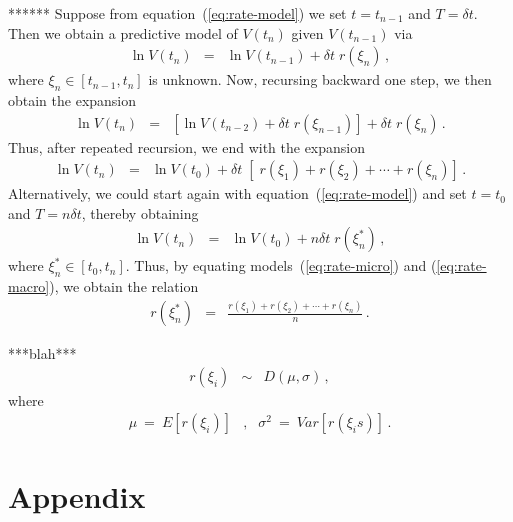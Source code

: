 \documentclass[a4paper]{book}
\begin{document}
******
Suppose from equation~(\ref{eq:rate-model}) we set $t=t_{n-1}$
and $T=\delta t$. Then we obtain a predictive model of $V(t_n)$
given $V(t_{n-1})$ via
\begin{eqnarray}
\ln V(t_n) & = & \ln V(t_{n-1})+\delta t\;r(\xi_{n})\,,
\end{eqnarray}
where $\xi_n\in[t_{n-1},t_{n}]$ is unknown.
Now, recursing backward one step, we then obtain the expansion
\begin{eqnarray}
\ln V(t_n) & = & [\ln V(t_{n-2})+\delta t\;r(\xi_{n-1})]
+\delta t\;r(\xi_{n})\,.
\end{eqnarray}
Thus, after repeated recursion, we end with the expansion
\begin{eqnarray}
\ln V(t_n) & = & \ln V(t_{0})+\delta t\;[
\;r(\xi_{1})+r(\xi_{2})+\cdots+r(\xi_{n})]\,.
\label{eq:rate-micro}
\end{eqnarray}
Alternatively, we could start again with
equation~(\ref{eq:rate-model}) and set $t=t_{0}$
and $T=n\delta t$, thereby obtaining
\begin{eqnarray}
\ln V(t_n) & = & \ln V(t_{0})+n\delta t\;
r(\xi_{n}^{*})\,,
\label{eq:rate-macro}
\end{eqnarray}
where $\xi_{n}^{*}\in[t_0,t_n]$.
Thus, by equating models~(\ref{eq:rate-micro}) and
(\ref{eq:rate-macro}), we obtain the relation
\begin{eqnarray}
r(\xi_{n}^{*}) & = & 
\frac{r(\xi_{1})+r(\xi_{2})+\cdots+r(\xi_{n})}{n}\,.
\end{eqnarray}

***blah***
\begin{eqnarray}
r(\xi_i) & \sim & D(\mu,\sigma)\,,
\end{eqnarray}
where
\begin{eqnarray}
\mu~=~E[r(\xi_i)] &,&  \sigma^2~=~Var[r(\xi_is)]\,.
\end{eqnarray}


\chapter{Appendix}
\end{document}
